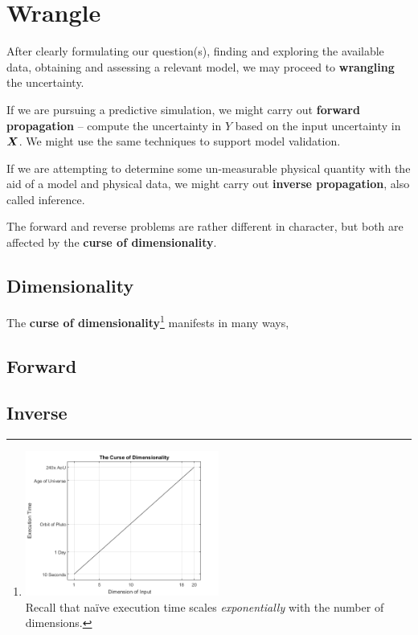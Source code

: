\documentclass[../primer.tex]{subfiles}
\begin{document}
\chapter{Wrangle}
After clearly formulating our question(s), finding and exploring the available
data, obtaining and assessing a relevant model, we may proceed to
\textbf{wrangling} the uncertainty.

If we are pursuing a predictive simulation, we might carry out \textbf{forward
  propagation} -- compute the uncertainty in $Y$ based on the input uncertainty
in $\boldsymbol{X}$. We might use the same techniques to support model validation.

If we are attempting to determine some un-measurable physical quantity with the
aid of a model and physical data, we might carry out \textbf{inverse
  propagation}, also called inference.

The forward and reverse problems are rather different in character, but both
are affected by the \textbf{curse of dimensionality}.

\section{Dimensionality}
The \textbf{curse of
  dimensionality}\footnote{\includegraphics[width=0.50\textwidth]{./images/curse_of_dimensionality}\\ Recall
  that na\"ive execution time scales \emph{exponentially} with the number of
  dimensions.} manifests in many ways,

\section{Forward}

\section{Inverse}
\end{document}
